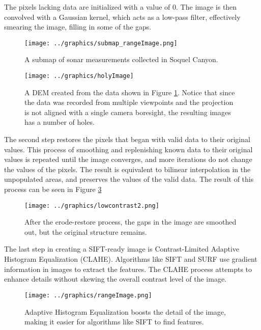 The pixels lacking data are initialized with a value of $0$. The image is then convolved with a Gaussian kernel, which acts as a low-pass filter, effectively smearing the image, filling in some of the gaps. 

\begin{figure}[htb]
   \centering
   \texttt{[image: ../graphics/submap\_rangeImage.png]} %
   \caption{A submap of sonar measurements collected in Soquel Canyon.}
   \label{fig:submap_rangeImage}
\end{figure}

\begin{figure}[htb]
   \centering
   \texttt{[image: ../graphics/holyImage]} %
   \caption{A DEM created from the data shown in Figure \ref{fig:submap_rangeImage}. Notice that since the data was recorded from multiple viewpoints and the projection is not aligned with a single camera boresight, the resulting images has a number of holes.}
   \label{fig:holyImage}
\end{figure}

The second step restores the pixels that began with valid data to their original values. This process of smoothing and replenishing known data to their original values is repeated until the image converges, and more iterations do not change the values of the pixels. The result is equivalent to bilinear interpolation in the unpopulated areas, and preserves the values of the valid data. The result of this process can be seen in Figure \ref{fig:rangeImage}

\begin{figure}[htb]
   \centering
   \texttt{[image: ../graphics/lowcontrast2.png]} %
   \caption{After the erode-restore process, the gaps in the image are smoothed out, but the original structure remains.}
   \label{fig:rangeImage}
\end{figure}

The last step in creating a SIFT-ready image is Contrast-Limited Adaptive Histogram Equalization (CLAHE). Algorithms like SIFT and SURF use gradient information in images to extract the features. The CLAHE process attempts to enhance details without skewing the overall contrast level of the image. \cite{Reza2004}

\begin{figure}[htb]
   \centering
   \texttt{[image: ../graphics/rangeImage.png]} %
   \caption{Adaptive Histogram Equalization boosts the detail of the image, making it easier for algorithms like SIFT to find features.}
   \label{fig:rangeImageHC}
\end{figure}

